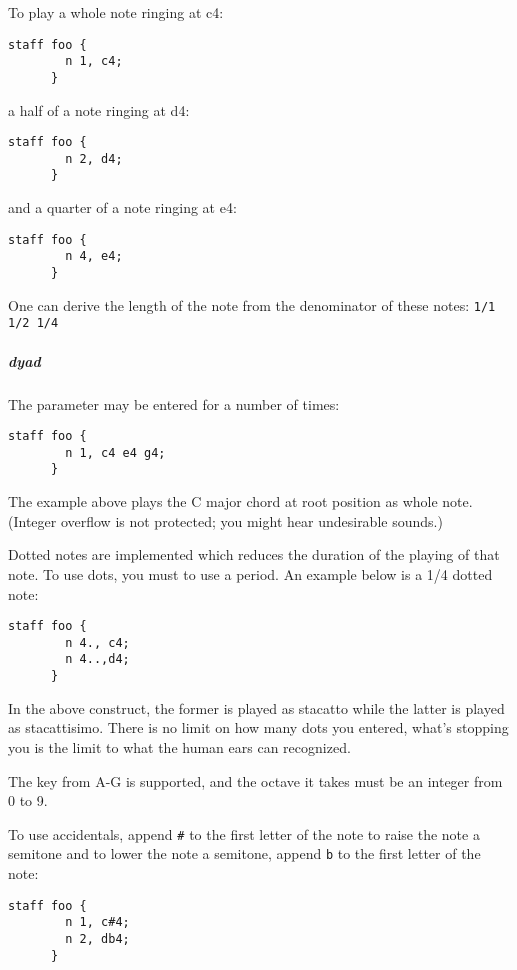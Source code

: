 \np To play a whole note ringing at c4:
\begin{Verbatim}[frame=single]
      staff foo {
        n 1, c4;
      }
\end{Verbatim}

a half of a note ringing at d4:

\begin{Verbatim}[frame=single]
      staff foo {
        n 2, d4;
      }
\end{Verbatim}

and a quarter of a note ringing at e4:
\begin{Verbatim}[frame=single]
      staff foo {
        n 4, e4;
      }
\end{Verbatim}

\np One can derive the length of the note from the denominator of these notes:
\verb+1/1 1/2 1/4+

\subparagraph{dyad}
The parameter  may be entered for a number of times:

\begin{Verbatim}[frame=single]
      staff foo {
        n 1, c4 e4 g4;
      }
\end{Verbatim}

\np The example above plays the C major chord at root position as whole note. (Integer overflow is not
protected; you might hear undesirable sounds.)

\np Dotted notes are implemented which reduces the duration of the playing of
that note. To use dots, you must to use a period. An example below is a 1/4 dotted note:
\begin{Verbatim}[frame=single]
      staff foo {
        n 4., c4;
        n 4..,d4;
      }
\end{Verbatim}

\np In the above construct, the former is played as stacatto while the latter is played
as stacattisimo. There is no limit on how many dots you entered, what's stopping you
is the limit to what the human ears can recognized.

\np The key from A-G is supported, and the octave it takes must be an integer
from 0 to 9.

\np To use accidentals, append \verb+#+ to the first letter of the note to raise the note a semitone and to lower the
note a semitone, append \verb+b+ to the first letter of the note:
\begin{Verbatim}[frame=single]
      staff foo {
        n 1, c#4;
        n 2, db4;
      }
\end{Verbatim}

